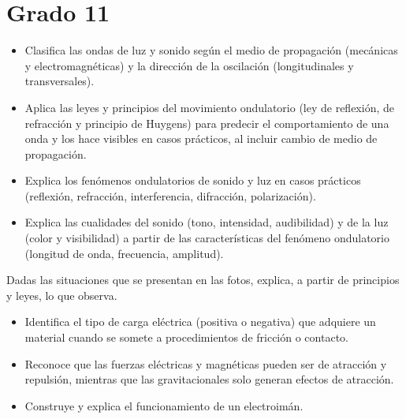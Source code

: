 \section{Grado 11}\label{grado:11}


\evidencias

\begin{itemize}
  \item Clasifica las ondas de luz y sonido según el medio de propagación (mecánicas y electromagnéticas) y la dirección de la oscilación (longitudinales y transversales).
  \item Aplica las leyes y principios del movimiento ondulatorio (ley de reflexión, de refracción y principio de Huygens) para predecir el comportamiento de una onda y los hace visibles en casos prácticos, al incluir cambio de medio de propagación.
  \item Explica los fenómenos ondulatorios de sonido y luz en casos prácticos (reflexión, refracción, interferencia, difracción, polarización).
  \item Explica las cualidades del sonido (tono, intensidad, audibilidad) y de la luz (color y visibilidad) a partir de las características del fenómeno ondulatorio (longitud de onda, frecuencia, amplitud).
\end{itemize}

\ejemplo

Dadas las situaciones que se presentan en las fotos, explica, a partir de principios y leyes, lo que observa.




\evidencias

\begin{itemize}
  \item Identifica el tipo de carga eléctrica (positiva o negativa) que adquiere un material cuando se somete a procedimientos de fricción o contacto.
  \item Reconoce que las fuerzas eléctricas y magnéticas pueden ser de atracción y repulsión, mientras que las gravitacionales solo generan efectos de atracción.
  \item Construye y explica el funcionamiento de un electroimán.
\end{itemize}

